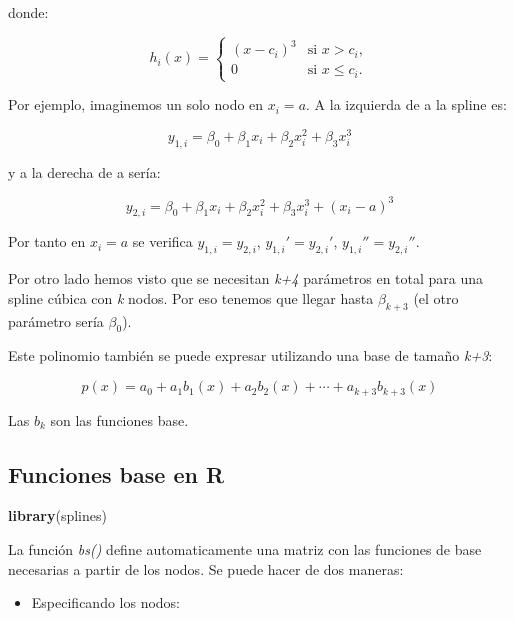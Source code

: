 \documentclass[
]{article}
\newenvironment{Shaded}{\begin{snugshade}}{\end{snugshade}}
\newcommand{\KeywordTok}[1]{\textcolor[rgb]{0.13,0.29,0.53}{\textbf{#1}}}
\newcommand{\NormalTok}[1]{#1}
\providecommand{\tightlist}{%
  \setlength{\itemsep}{0pt}\setlength{\parskip}{0pt}}
\begin{document}
donde:

\[
\begin{equation*}
h_i(x) = 
\begin{cases}
(x - c_i)^3 & \text{si } x > c_i,\\
0 & \text{si } x \leq c_i.
\end{cases} 
\end{equation*}
\]

Por ejemplo, imaginemos un solo nodo en \(x_i = a\). A la izquierda de a
la spline es:

\[
y_{1,i} = \beta_0 + \beta_1 x_i + \beta_2 x_i^2 + \beta_3 x_i^3 
\]

y a la derecha de a sería:

\[
y_{2,i} = \beta_0 + \beta_1 x_i + \beta_2 x_i^2 + \beta_3 x_i^3 + (x_i - a)^3
\]

Por tanto en \(x_i = a\) se verifica \(y_{1,i} = y_{2,i}\),
\(y_{1,i}' = y_{2,i}'\), \(y_{1,i}'' = y_{2,i}''\).

Por otro lado hemos visto que se necesitan \emph{k+4} parámetros en
total para una spline cúbica con \emph{k} nodos. Por eso tenemos que
llegar hasta \(\beta_{k+3}\) (el otro parámetro sería \(\beta_0\)).

Este polinomio también se puede expresar utilizando una base de tamaño
\emph{k+3}:

\[
p(x) = a_0 + a_1 b_1(x) + a_2 b_2(x) + \cdots + a_{k+3} b_{k+3}(x)
\]

Las \(b_k\) son las funciones base.

\hypertarget{funciones-base-en-r}{%
\subsection{Funciones base en R}\label{funciones-base-en-r}}

\begin{Shaded}
\begin{Highlighting}[]
\KeywordTok{library}\NormalTok{(splines)}
\end{Highlighting}
\end{Shaded}

La función \emph{bs()} define automaticamente una matriz con las
funciones de base necesarias a partir de los nodos. Se puede hacer de
dos maneras:

\begin{itemize}
\tightlist
\item
  Especificando los nodos:
\end{itemize}
\end{document}

